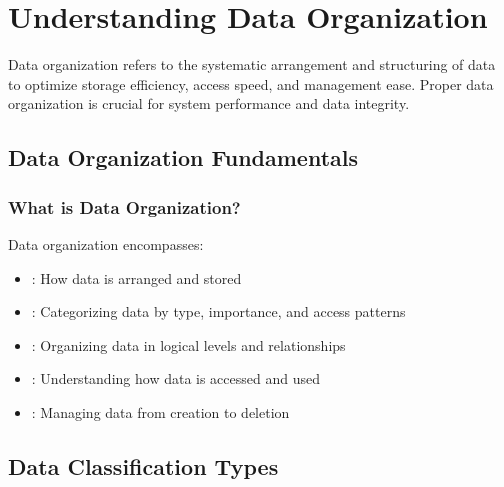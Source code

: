 \documentclass[letterpaper,10pt,english]{sphinxmanual}
\begin{document}
\section{Understanding Data Organization}
\label{\detokenize{data-organization:understanding-data-organization}}
\sphinxAtStartPar
Data organization refers to the systematic arrangement and structuring of data to optimize storage efficiency, access speed, and management ease. Proper data organization is crucial for system performance and data integrity.


\subsection{Data Organization Fundamentals}
\label{\detokenize{data-organization:data-organization-fundamentals}}

\subsubsection{What is Data Organization?}
\label{\detokenize{data-organization:what-is-data-organization}}
\sphinxAtStartPar
Data organization encompasses:
\begin{itemize}
\item {} 
\sphinxAtStartPar
{}: How data is arranged and stored

\item {} 
\sphinxAtStartPar
{}: Categorizing data by type, importance, and access patterns

\item {} 
\sphinxAtStartPar
{}: Organizing data in logical levels and relationships

\item {} 
\sphinxAtStartPar
{}: Understanding how data is accessed and used

\item {} 
\sphinxAtStartPar
{}: Managing data from creation to deletion

\end{itemize}


\subsection{Data Classification Types}
\label{\detokenize{data-organization:data-classification-types}}
\end{document}
